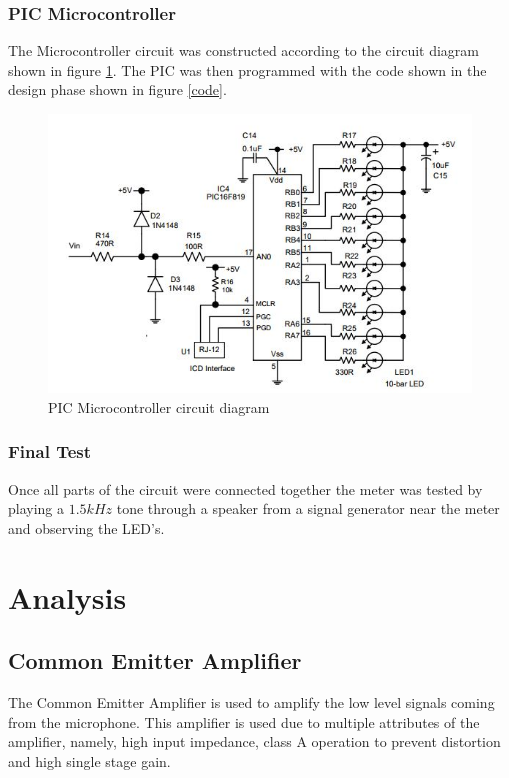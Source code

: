 \documentclass[10pt,a4paper]{article}
\begin{document}
\subsubsection{PIC Microcontroller}
The Microcontroller circuit was constructed according to the circuit diagram shown in figure \ref{PIC}. The PIC was then programmed with the code shown in the design phase shown in figure \ref{code}.

\begin{figure}[!h]
\includegraphics[width = \textwidth]{PIC}
\caption{PIC Microcontroller circuit diagram}
\label{PIC}
\end{figure} 

\subsubsection{Final Test}
Once all parts of the circuit were connected together the meter was tested by playing a $1.5kHz$ tone through a speaker from a signal generator near the meter and observing the LED's.







\section{Analysis}
\subsection{Common Emitter Amplifier}
The Common Emitter Amplifier is used to amplify the low level signals coming from the microphone. This amplifier is used due to multiple attributes of the amplifier, namely, high input impedance, class A operation to prevent distortion and high single stage gain.
\end{document}
